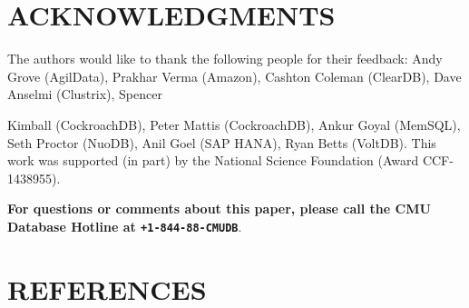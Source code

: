 \documentclass[a4paper,11pt,twoside,openright]{article}
\begin{document}
\hypertarget{acknowledgments}{%
\section*{ACKNOWLEDGMENTS}\label{acknowledgments}}

The authors would like to thank the following people for their feedback:
Andy Grove (AgilData), Prakhar Verma (Amazon), Cashton Coleman
(ClearDB), Dave Anselmi (Clustrix), Spencer

Kimball (CockroachDB), Peter Mattis (CockroachDB), Ankur Goyal (MemSQL),
Seth Proctor (NuoDB), Anil Goel (SAP HANA), Ryan Betts (VoltDB). This
work was supported (in part) by the National Science Foundation (Award
CCF-1438955).

\textbf{For questions or comments about this paper, please call the CMU Database
Hotline at \texttt{+1-844-88-CMUDB}}.

\hypertarget{references}{%
\section{REFERENCES}\label{references}}
\end{document}
